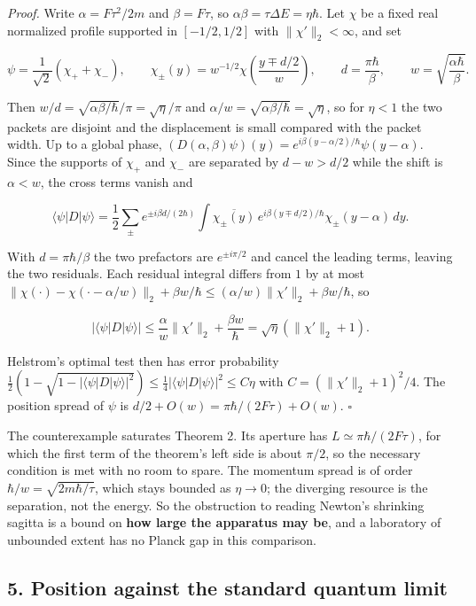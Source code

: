 \documentclass[11pt,a4paper]{article}
\begin{document}
\emph{Proof.} Write \(\alpha=F\tau^2/2m\) and \(\beta=F\tau\), so
\(\alpha\beta=\tau\Delta E=\eta\hbar\). Let \(\chi\) be a fixed real
normalized profile supported in \([-1/2,1/2]\) with
\(\|\chi'\|_2<\infty\), and set

\[\psi=\frac{1}{\sqrt2}\left(\chi_++\chi_-\right),\qquad
\chi_\pm(y)=w^{-1/2}\chi\!\left(\frac{y\mp d/2}{w}\right),\qquad
d=\frac{\pi\hbar}{\beta},\qquad w=\sqrt{\frac{\alpha\hbar}{\beta}} .\]

Then \(w/d=\sqrt{\alpha\beta/\hbar}/\pi=\sqrt\eta/\pi\) and
\(\alpha/w=\sqrt{\alpha\beta/\hbar}=\sqrt\eta\), so for \(\eta<1\) the
two packets are disjoint and the displacement is small compared with the
packet width. Up to a global phase,
\((D(\alpha,\beta)\psi)(y)=e^{i\beta(y-\alpha/2)/\hbar}\psi(y-\alpha)\).
Since the supports of \(\chi_+\) and \(\chi_-\) are separated by
\(d-w>d/2\) while the shift is \(\alpha<w\), the cross terms vanish and

\[\langle\psi|D|\psi\rangle=\frac12\sum_{\pm}e^{\pm i\beta d/(2\hbar)}
\int \overline{\chi_\pm(y)}\,e^{i\beta(y\mp d/2)/\hbar}\chi_\pm(y-\alpha)\,dy .\]

With \(d=\pi\hbar/\beta\) the two prefactors are \(e^{\pm i\pi/2}\) and
cancel the leading terms, leaving the two residuals. Each residual
integral differs from \(1\) by at most
\(\|\chi(\cdot)-\chi(\cdot-\alpha/w)\|_2 +\beta w/\hbar\le(\alpha/w)\|\chi'\|_2+\beta w/\hbar\),
so

\[|\langle\psi|D|\psi\rangle|\le\frac{\alpha}{w}\|\chi'\|_2+\frac{\beta w}{\hbar}
=\sqrt\eta\left(\|\chi'\|_2+1\right).\]

Helstrom's optimal test then has error probability
\(\frac12(1-\sqrt{1-|\langle\psi|D|\psi\rangle|^2})\le\frac14|\langle\psi|D|\psi\rangle|^2 \le C\eta\)
with \(C=(\|\chi'\|_2+1)^2/4\). The position spread of \(\psi\) is
\(d/2+O(w)=\pi\hbar/(2F\tau)+O(w)\). \(\square\)

The counterexample saturates Theorem 2. Its aperture has
\(L\simeq\pi\hbar/(2F\tau)\), for which the first term of the theorem's
left side is about \(\pi/2\), so the necessary condition is met with no
room to spare. The momentum spread is of order
\(\hbar/w=\sqrt{2m\hbar/\tau}\), which stays bounded as \(\eta\to0\);
the diverging resource is the separation, not the energy. So the
obstruction to reading Newton's shrinking sagitta is a bound on
\textbf{how large the apparatus may be}, and a laboratory of unbounded
extent has no Planck gap in this comparison.

\hypertarget{position-against-the-standard-quantum-limit}{%
\subsection{5. Position against the standard quantum
limit}\label{position-against-the-standard-quantum-limit}}
\end{document}
